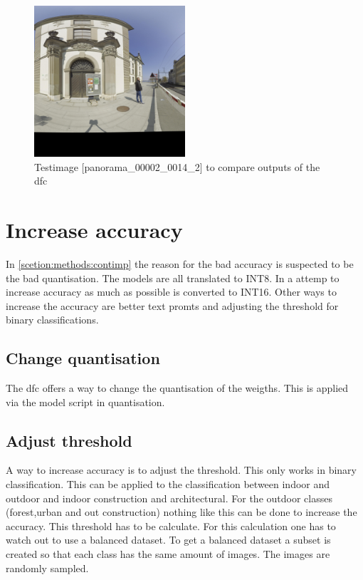 \begin{figure}
    \centering
    \includegraphics[width=0.5\textwidth]{Images/Implementation/panorama_00002_0014_2_testIMg.jpg}
    \caption{Testimage [panorama\_00002\_0014\_2] to compare outputs of the \acrshort{dfc}}
    \label{methods:fig:comparetestpic}
\end{figure}

\section{Increase accuracy}

In \cref{scetion:methods:contimp} the reason for the bad accuracy is suspected to be the bad quantisation.
The models are all translated to INT8.
In a attemp to increase accuracy as much as possible is converted to INT16.
Other ways to increase the accuracy are better text promts and adjusting the threshold for binary classifications.


\subsection{Change quantisation}

The \acrshort{dfc} offers a way to change the quantisation of the weigths.
This is applied via the model script in quantisation.



\subsection{Adjust threshold}

A way to increase accuracy is to adjust the threshold.
This only works in binary classification.
This can be applied to the classification between indoor and outdoor and indoor construction and architectural.
For the outdoor classes (forest,urban and out construction) nothing like this can be done to increase the accuracy.
This threshold has to be calculate.
For this calculation one has to watch out to use a balanced dataset.
To get a balanced dataset a subset is created so that each class has the same amount of images.
The images are randomly sampled.

